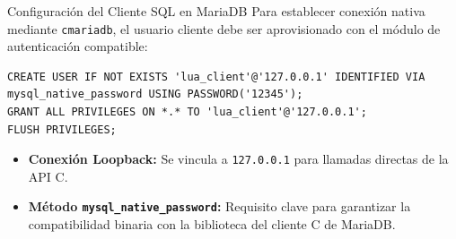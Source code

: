 \documentclass[10pt,aspectratio=169]{beamer}
\begin{document}
\begin{frame}[fragile]{Configuración del Cliente SQL en MariaDB}
    Para establecer conexión nativa mediante \texttt{cmariadb}, el usuario cliente debe ser aprovisionado con el módulo de autenticación compatible:

    \begin{lstlisting}[style=sqlstyle, caption={Comandos ejecutados en MariaDB CLI}]
CREATE USER IF NOT EXISTS 'lua_client'@'127.0.0.1' IDENTIFIED VIA mysql_native_password USING PASSWORD('12345');
GRANT ALL PRIVILEGES ON *.* TO 'lua_client'@'127.0.0.1';
FLUSH PRIVILEGES;
    \end{lstlisting}
    \begin{itemize}
        \item \textbf{Conexión Loopback:} Se vincula a \texttt{127.0.0.1} para llamadas directas de la API C.
        \item \textbf{Método \texttt{mysql\_native\_password}:} Requisito clave para garantizar la compatibilidad binaria con la biblioteca del cliente C de MariaDB.
    \end{itemize}
\end{frame}
\end{document}
